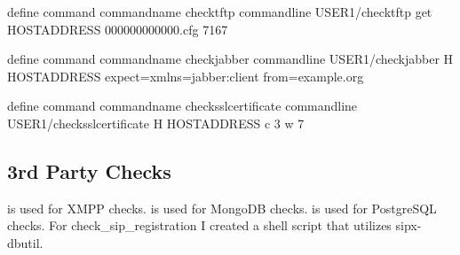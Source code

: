 \documentclass[letterpaper,10pt,english]{sphinxmanual}
\begin{document}
\begin{sphinxVerbatim}[commandchars=\\\{\}]
define command\PYGZob{}
command\PYGZus{}name check\PYGZus{}tftp
command\PYGZus{}line \PYGZdl{}USER1\PYGZdl{}/check\PYGZus{}tftp \PYGZhy{}\PYGZhy{}get \PYGZdl{}HOSTADDRESS\PYGZdl{} 000000000000.cfg 7167
\PYGZcb{}

define command\PYGZob{}
command\PYGZus{}name check\PYGZus{}jabber
command\PYGZus{}line \PYGZdl{}USER1\PYGZdl{}/check\PYGZus{}jabber \PYGZhy{}H \PYGZdl{}HOSTADDRESS\PYGZdl{} \PYGZhy{}\PYGZhy{}expect=\PYGZsq{}xmlns=\PYGZdq{}jabber:client\PYGZdq{} from=\PYGZdq{}example.org\PYGZdq{}\PYGZsq{}
\PYGZcb{}

define command \PYGZob{}
command\PYGZus{}name check\PYGZus{}ssl\PYGZus{}certificate
command\PYGZus{}line \PYGZdl{}USER1\PYGZdl{}/check\PYGZus{}ssl\PYGZus{}certificate \PYGZhy{}H \PYGZdl{}HOSTADDRESS\PYGZdl{} \PYGZhy{}c 3 \PYGZhy{}w 7
\PYGZcb{}
\end{sphinxVerbatim}


\subsection{3rd Party Checks}
\label{\detokenize{monitoring:rd-party-checks}}
 is used for XMPP checks.
 is used for MongoDB checks.
 is used for PostgreSQL checks.
For check\_sip\_registration I created a shell script that utilizes sipx-dbutil.
\end{document}
